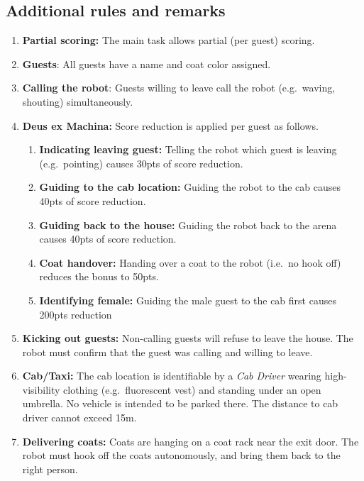 \subsection*{Additional rules and remarks}
\begin{enumerate}[nosep]
	\item \textbf{Partial scoring:} The main task allows partial (per guest) scoring.

	\item \textbf{Guests}: All guests have a name and coat color assigned.

	\item \textbf{Calling the robot}: Guests willing to leave call the robot (e.g.~waving, shouting) simultaneously.

	\item \textbf{Deus ex Machina:} Score reduction is applied per guest as follows.
	\begin{enumerate}[nosep]
		\item \textbf{Indicating leaving guest:} Telling the robot which guest is leaving (e.g.~pointing) causes 30pts of score reduction.

		\item \textbf{Guiding to the cab location:} Guiding the robot to the cab causes 40pts of score reduction.

		\item \textbf{Guiding back to the house:} Guiding the robot back to the arena causes 40pts of score reduction.

		\item \textbf{Coat handover:} Handing over a coat to the robot (i.e.~no hook off) reduces the bonus to 50pts.
		
		\item \textbf{Identifying female:} Guiding the male guest to the cab first causes 200pts reduction
	\end{enumerate}

	\item \textbf{Kicking out guests:} Non-calling guests will refuse to leave the house. The robot must confirm that the guest was calling and willing to leave.

	\item \textbf{Cab/Taxi:} The cab location is identifiable by a \emph{Cab Driver} wearing high-visibility clothing (e.g.~fluorescent vest) and standing under an open umbrella.
	No vehicle is intended to be parked there.
	The distance to cab driver cannot exceed 15m.

	\item \textbf{Delivering coats:} Coats are hanging on a coat rack near the exit door.
	The robot must hook off the coats autonomously, and bring them back to the right person.
\end{enumerate}


